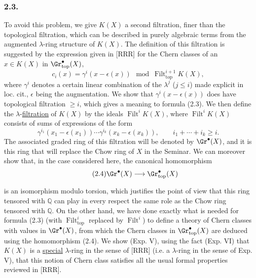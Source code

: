 \subsubsection*{2.3.}
To avoid this problem, we give $K(X)$ a second filtration, finer than the topological filtration, which can be described in purely algebraic terms from the augmented $\lambda$-ring structure of $K(X)$. The definition of this filtration is suggested by the expression given in [RRR] for the Chern classes of an $x\in K(X)$ in $\Gr^{\bullet}_{\mathrm{top}}(X)$,
\begin{equation}\tag{2.3}
c_i(x)=\gamma^i(x-\epsilon(x))\mod \operatorname{Filt}^{i+1}_{\mathrm{top}}K(X),
\end{equation}
where $\gamma^i$ denotes a certain linear combination of the $\lambda^j$ ($j\leq i$) made explicit in loc. cit., $\epsilon$ being the augmentation. We show that $\gamma^i(x-\epsilon(x))$ does have topological filtration $\ge i$, which gives a meaning to formula (2.3). We then define the $\lambda$-\underline{filtration} of $K(X)$ by the ideals $\operatorname{Filt}^i K(X)$, where $\operatorname{Filt}^i K(X)$ consists of sums of expressions of the form
\[
\gamma^{i_1}(x_1-\epsilon(x_1))\cdots \gamma^{i_k}(x_k-\epsilon(x_k)),\qquad i_1+\cdots+i_k\ge i.
\]
The associated graded ring of this filtration will be denoted by $\Gr^\bullet(X)$, and it is this ring that will replace the Chow ring of $X$ in the Seminar. We can moreover show that, in the case considered here, the canonical homomorphism
\begin{equation}\tag{2.4}
\Gr^\bullet(X)\longrightarrow \Gr^{\bullet}_{\mathrm{top}}(X)
\end{equation}

is an isomorphism modulo torsion, which justifies the point of view that this ring tensored with $\mathbb Q$ can play in every respect the same role as the Chow ring tensored with $\mathbb Q$. On the other hand, we have done exactly what is needed for formula (2.3) (with $\operatorname{Filt}^i_{\mathrm{top}}$ replaced by $\operatorname{Filt}^i$) to define a theory of Chern classes with values in $\Gr^\bullet(X)$, from which the Chern classes in $\Gr^{\bullet}_{\mathrm{top}}(X)$ are deduced using the homomorphism (2.4). We show (Exp. V), using the fact (Exp. VI) that $K(X)$ is a \underline{special} $\lambda$-ring in the sense of [RRR] (i.e. a $\lambda$-ring in the sense of Exp. V), that this notion of Chern class satisfies all the usual formal properties reviewed in [RRR].

